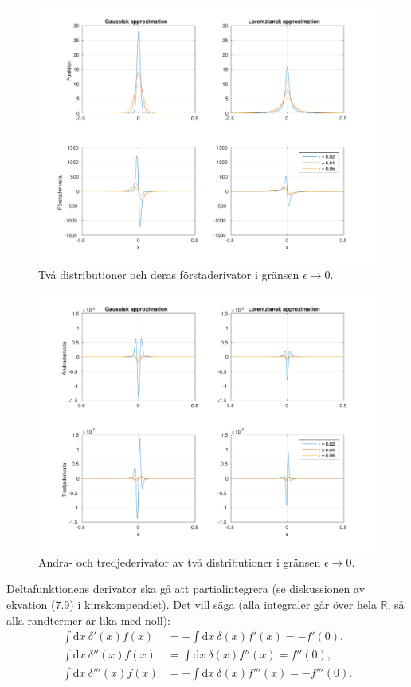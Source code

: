 \documentclass[%
oneside,                 %
final,                   %
10pt]{article}
\newenvironment{doconceexercise}{}{}
\begin{document}
\begin{doconceexercise}
\begin{figure}[!ht]  %
  \centerline{\includegraphics[width=0.9\linewidth]{fig/fig721.pdf}}
  \caption{
  Två distributioner och deras förstaderivator i gränsen $\epsilon \to 0$. \label{fig:71}
  }
\end{figure}



\begin{figure}[!ht]  %
  \centerline{\includegraphics[width=0.9\linewidth]{fig/fig722.pdf}}
  \caption{
  Andra- och tredjederivator av två distributioner i gränsen $\epsilon \to 0$. \label{fig:72}
  }
\end{figure}


Deltafunktionens derivator ska gå att partialintegrera (se diskussionen av ekvation (7.9) i kurskompendiet). Det vill säga (alla integraler går över hela $\mathbb R$, så alla randtermer är lika med noll):
\begin{align}
    \int \mathrm dx\ \delta'(x)f(x)&=-\int \mathrm dx\ \delta(x)f'(x)=-f'(0),\\
    \int \mathrm dx\ \delta''(x)f(x)&=\int \mathrm dx\ \delta(x)f''(x)=f''(0),\\
    \int \mathrm dx\ \delta'''(x)f(x)&=-\int \mathrm dx\ \delta(x)f'''(x)=-f'''(0).
    \label{eq:tredje}
\end{align}


\end{doconceexercise}
\end{document}
